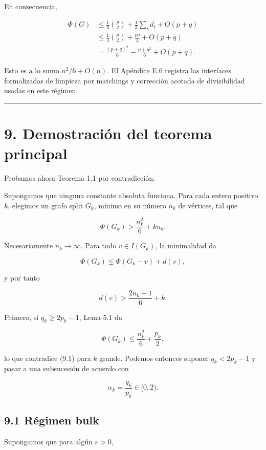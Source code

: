 \documentclass[
  spanish,
  11pt,
  a4paper,
]{article}
\begin{document}
En consecuencia,

\[
\begin{aligned}
\Phi(G)
&\le
\frac13\binom p2+\frac13\sum_i d_i+O(p+q)\\
&\le
\frac13\binom p2+\frac{pq}{3}+O(p+q)\\
&=
\frac{(p+q)^2}{6}-\frac{p+q^2}{6}+O(p+q).
\end{aligned}
\tag{8.11}
\]

Esto es a lo sumo \(n^2/6+O(n)\). El Apéndice E.6 registra las interfaces formalizadas de limpieza por matchings y corrección acotada de divisibilidad usadas en este régimen.

\begin{center}\rule{0.5\linewidth}{0.5pt}\end{center}

\section{9. Demostración del teorema principal}\label{demostraciuxf3n-del-teorema-principal}

Probamos ahora Teorema 1.1 por contradicción.

Supongamos que ninguna constante absoluta funciona. Para cada entero positivo \(k\), elegimos un grafo split \(G_k\), mínimo en su número \(n_k\) de vértices, tal que

\[
\Phi(G_k)
>
\frac{n_k^2}{6}+kn_k.
\tag{9.1}
\]

Necesariamente \(n_k\to\infty\). Para todo \(v\in I(G_k)\), la minimalidad da

\[
\Phi(G_k)
\le
\Phi(G_k-v)+d(v),
\]

y por tanto

\[
\boxed{
d(v)>
\frac{2n_k-1}{6}+k.
}
\tag{9.2}
\]

Primero, si \(q_k\ge2p_k-1\), Lema 5.1 da

\[
\Phi(G_k)
\le
\frac{n_k^2}{6}+\frac{p_k}{2},
\]

lo que contradice (9.1) para \(k\) grande. Podemos entonces suponer \(q_k<2p_k-1\) y pasar a una subsucesión de acuerdo con

\[
\alpha_k=\frac{q_k}{p_k}\in[0,2).
\]

\subsection{9.1 Régimen bulk}\label{ruxe9gimen-bulk}

Supongamos que para algún \(\varepsilon>0\),
\end{document}
